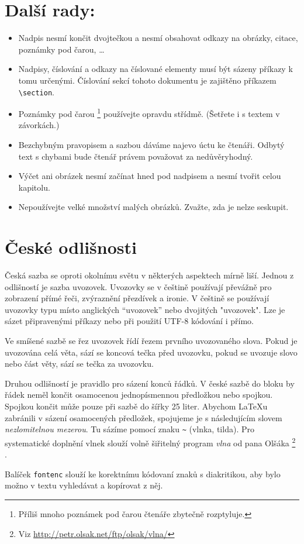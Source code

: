 \documentclass[a4paper, 10pt, twocolumn]{article}
\begin{document}
    \section{Další rady:}
    \begin{itemize}
        \item Nadpis nesmí končit dvojtečkou a nesmí obsahovat odkazy na obrázky,
        citace, poznámky pod čarou, \ldots
        \item Nadpisy, číslování a odkazy na číslované elementy musí být sázeny
        příkazy k tomu určenými. Číslování sekcí tohoto dokumentu je zajištěno příkazem
        \verb!\section!.
        \item Poznámky pod čarou%
        \footnote[1]{Příliš mnoho poznámek pod čarou čtenáře zbytečně rozptyluje.}
        používejte opravdu střídmě. (Šetřete i s textem v závorkách.)
        \item Bezchybným pravopisem a sazbou dáváme najevo úctu ke čtenáři.
        Odbytý text s chybami bude čtenář právem považovat za nedůvěryhodný.
        \item Výčet ani obrázek nesmí začínat hned pod nadpisem a nesmí tvořit celou kapitolu.
        \item Nepoužívejte velké množství malých obrázků. Zvažte, zda je nelze seskupit.
    \end{itemize}

    \section{České odlišnosti}
    Česká sazba se oproti okolnímu světu v některých aspektech mírně liší. Jednou z
    odlišností je sazba uvozovek. Uvozovky se v češtině používají převážně pro zobrazení přímé
    řeči, zvýraznění přezdívek a ironie. V češtině se používají uvozovky typu 
    místo anglických ``uvozovek'' nebo dvojitých "uvozovek". Lze je sázet připravenými příkazy
    nebo při použití UTF-8 kódování i přímo.
    \par
    Ve smíšené sazbě se řez uvozovek řídí řezem prvního uvozovaného slova.
    Pokud je uvozována celá věta, sází se koncová tečka před uvozovku,
    pokud se uvozuje slovo nebo část věty, sází se tečka za uvozovku.
    \par
    Druhou odlišností je pravidlo pro sázení konců řádků. V české sazbě do bloku by řádek
    neměl končit osamocenou jednopísmennou předložkou nebo spojkou. Spojkou  končit
    může pouze při sazbě do šířky 25 liter. Abychom \LaTeX u zabránili v sázení osamocených
    předložek, spojujeme je s následujícím slovem \textit{nezlomitelnou mezerou}.
    Tu sázíme pomocí znaku \verb!~! (vlnka, tilda). Pro systematické doplnění vlnek slouží volně
    šiřitelný program \textit{vlna} od pana Olšáka%
    \footnote[2]{Viz \href{http://petr.olsak.net/ftp/olsak/vlna/}{http://petr.olsak.net/ftp/olsak/vlna/}}%
    .
    \par
    Balíček \texttt{fontenc} slouží ke korektnímu kódovaní znaků s diakritikou, aby bylo
    možno v textu vyhledávat a kopírovat z něj.
\end{document}
